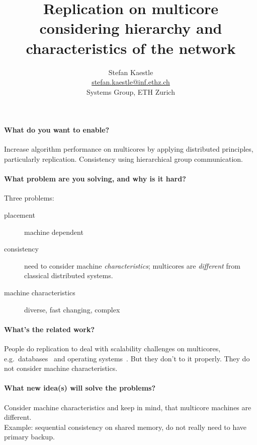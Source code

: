 \documentclass{article}
\begin{document}
\title{Replication on multicore considering hierarchy and
  characteristics of the network}

\newcommand{\eaddr}{stefan.kaestle@inf.ethz.ch}
\newcommand{\email}{\href{mailto:\eaddr}{\eaddr}}

\author{Stefan Kaestle\\
  \email \\
  Systems Group, ETH Zurich}

\maketitle

\paragraph{What do you want to enable?} Increase algorithm performance
on multicores by applying distributed principles, particularly
replication. Consistency using hierarchical group communication.

\paragraph{What problem are you solving, and why is it hard?} Three problems:
\begin{description}
\item[placement] machine dependent
\item[consistency] need to consider machine \emph{characteristics};
  multicores are \emph{different} from classical distributed systems.
\item[machine characteristics] diverse, fast changing, complex
\end{description}

\paragraph{What's the related work?} People do replication to deal
with scalability challenges on multicores, e.g.\
databases~\cite{Salomie2011, Wiesmann2000} and operating
systems~\cite{fos:osr09, tornado:osdi99, barrelfish:sosp09}. But they
don't to it properly. They do not consider machine characteristics.

\paragraph{What new idea(s) will solve the problems?} Consider machine
characteristics and keep in mind, that multicore machines are
different. \\
{\footnotesize Example: sequential consistency on shared memory, do
  not really need to have primary backup.}
\end{document}
